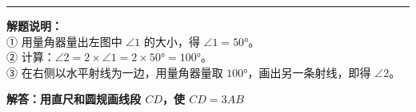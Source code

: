 \vspace{1cm}
\hrule
\vspace{0.4cm}

{\small\color{gray}
\textbf{解题说明：}\\
① 用量角器量出左图中 $\angle 1$ 的大小，得 $\angle 1 = 50°$。\\
② 计算：$\angle 2 = 2 \times \angle 1 = 2 \times 50° = 100°$。\\
③ 在右侧以水平射线为一边，用量角器量取 $100°$，画出另一条射线，即得 $\angle 2$。
}




\newpage

\begin{center}
  {\large\bfseries 解答：用直尺和圆规画线段 $CD$，使 $CD = 3AB$}
\end{center}

\vspace{0.6cm}

